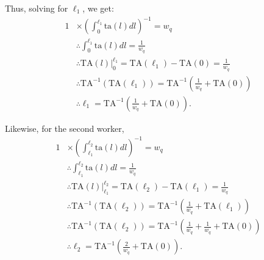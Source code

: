 \documentclass[hidelinks, nonatbib]{elsarticle}
\begin{document}
\begin{enumerate}
Thus, solving for $\ell_1$, we get:
\begin{align}
    1 
    &\times 
    \left(
        \int_{0}^{\ell_1}
        \text{ta}(l)
        dl
    \right) ^ {-1}
    =
    w_q
    \\
    &\therefore
    \int_{0}^{\ell_1}
    \text{ta}(l)
    dl
    =
    \frac{1}{w_q}
    \\
    &\therefore
    \text{TA}(l)
    \big|_{0}^{\ell_1}
    =
    \text{TA}(\ell_1)
    -
    \text{TA}(0)
    =
    \frac{1}{w_q}
    \\
    &\therefore
    \text{TA}^{-1}(
        \text{TA}(\ell_1)
    )
    =
    \text{TA}^{-1}\left(
        \frac{1}{w_q}
        +
        \text{TA}(0)
    \right)
    \\
    &\therefore
    \ell_1
    =
    \text{TA}^{-1}\left(
        \frac{1}{w_q}
        +
        \text{TA}(0)
    \right)
    .
\end{align}

Likewise, for the second worker,
\begin{align}
    1 
    &\times 
    \left(
        \int_{\ell_1}^{\ell_2}
        \text{ta}(l)
        dl
    \right) ^ {-1}
    =
    w_q
    \\
    &\therefore
    \int_{\ell_1}^{\ell_2}
    \text{ta}(l)
    dl
    =
    \frac{1}{w_q}
    \\
    &\therefore
    \text{TA}(l)
    \big|_{\ell_1}^{\ell_2}
    =
    \text{TA}(\ell_2)
    -
    \text{TA}(\ell_1)
    =
    \frac{1}{w_q}
    \\
    &\therefore
    \text{TA}^{-1}(
        \text{TA}(\ell_2)
    )
    =
    \text{TA}^{-1}\left(
        \frac{1}{w_q}
        +
        \text{TA}(\ell_1)
    \right)
    \\
    &\therefore
    \text{TA}^{-1}(
        \text{TA}(\ell_2)
    )
    =
    \text{TA}^{-1}\left(
        \frac{1}{w_q}
        +
        \frac{1}{w_q}
        +
        \text{TA}(0)
    \right)
    \\
    &\therefore
    \ell_2
    =
    \text{TA}^{-1}\left(
        \frac{2}{w_q}
        +
        \text{TA}(0)
    \right)
    .
\end{align}


\end{enumerate}
\end{document}
